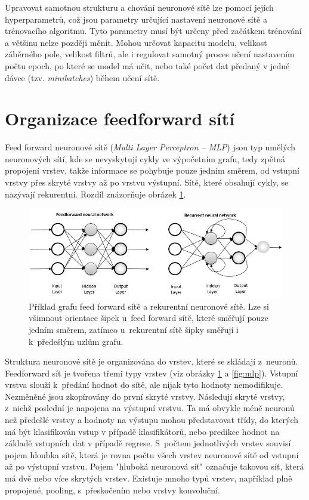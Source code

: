 Upravovat samotnou strukturu a chování neuronové sítě lze pomocí jejích hyperparametrů, což jsou parametry určující nastavení neuronové sítě a trénovacího algoritmu. Tyto parametry musí být určeny před začátkem trénování a většinu nelze později měnit. Mohou určovat kapacitu modelu, velikost záběrného pole, velikost filtrů, ale i regulovat samotný proces učení nastavením počtu epoch, po které se model má učit, nebo také počet dat předaný v jedné dávce (tzv. \textit{minibatches}) během učení sítě.


\section{Organizace feedforward sítí}
Feed forward neuronové sítě (\textit{Multi Layer Perceptron -- MLP}) jsou typ umělých neuronových sítí, kde se nevyskytují cykly ve výpočetním grafu, tedy zpětná propojení vrstev, takže informace se pohybuje pouze jedním směrem, od vstupní vrstvy přes skryté vrstvy až po vrstvu výstupní. Sítě, které obsahují cykly, se nazývají rekurentní. Rozdíl znázorňuje obrázek \ref{fig:netcomparison}.

\begin{figure}[H]
    \centering
    \includegraphics[scale=0.5]{obrazky-figures/feedforward_vs_recurrent.png}
    \caption{\label{fig:netcomparison}Příklad grafu feed forward sítě a rekurentní neuronové sítě. Lze si všimnout orientace šipek u~feed forward sítě, které směřují pouze jedním směrem, zatímco u~rekurentní sítě šipky směřují i k~předešlým uzlům grafu\cite{FFandRecNN}.}
\end{figure}

Struktura neuronové sítě je organizována do vrstev, které se skládají z~neuronů. Feedforward síť je tvořena třemi typy vrstev (viz obrázky \ref{fig:netcomparison} a \ref{fig:mlp}). Vstupní vrstva slouží k~předání hodnot do sítě, ale nijak tyto hodnoty nemodifikuje. Nezměněné jsou zkopírovány do první skryté vrstvy. Následují skryté vrstvy, z~nichž poslední je napojena na výstupní vrstvu. Ta má obvykle méně neuronů než předešlé vrstvy a hodnoty na výstupu mohou představovat třídy, do kterých má být klasifikován vstup v případě klasifikátorů, nebo predikce hodnot na základě vstupních dat v případě regrese. S~počtem jednotlivých vrstev souvisí pojem hloubka sítě, která je rovna počtu všech vrstev neuronové sítě od vstupní až po výstupní vrstvu. Pojem  "hluboká neuronová síť" označuje takovou síť, která má dvě nebo více skrytých vrstev. Existuje mnoho typů vrstev, například plně propojené, pooling, s~přeskočením nebo vrstvy konvoluční.

